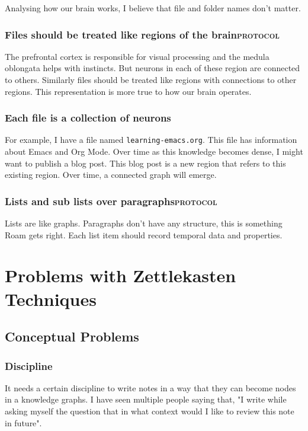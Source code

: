 \documentclass[11pt]{article}
\begin{document}
Analysing how our brain works, I believe that file and folder names don't matter.


\subsubsection{Files should be treated like regions of the brain\hfill{}\textsc{protocol}}
\label{sec:orgac20cb7}

The prefrontal cortex is responsible for visual processing and the medula oblongata helps with instincts. But neurons in each of these region are
connected to others. Similarly files should be treated like regions with connections to other regions. This representation is more true to how our brain operates.

\subsubsection{Each file is a collection of neurons}
\label{sec:org80ff597}
For example, I have a file named \texttt{learning-emacs.org}. This file has information about Emacs and Org Mode. Over time as this knowledge becomes dense,
I might want to publish a blog post. This blog post is a new region that refers to this existing region. Over time, a connected graph will emerge.

\subsubsection{Lists and sub lists over paragraphs\hfill{}\textsc{protocol}}
\label{sec:orgee6064f}
Lists are like graphs. Paragraphs don't have any structure, this is something Roam gets right. Each list item should record temporal data and properties.

\section{Problems with Zettlekasten Techniques}
\label{sec:org83ba306}
\subsection{Conceptual Problems}
\label{sec:org27a4c6d}
\subsubsection{Discipline}
\label{sec:org953b28b}
It needs a certain discipline to write notes in a way that they can become nodes in a knowledge graphs. I have seen multiple people saying that, "I write while asking myself the question that in what context would I like to review this note in future".
\end{document}
